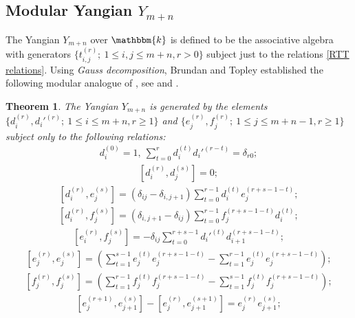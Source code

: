 \documentclass[12pt,reqno]{amsart}
\newcommand{\kk}{\mathbbm{k}}
\numberwithin{equation}{section}
\newtheorem{Theorem}{Theorem}[section]
\theoremstyle{Theorem}
\theoremstyle{remark}
\numberwithin{equation}{section}
\begin{document}
\subsection{Modular Yangian $Y_{m+n}$}
The Yangian $Y_{m+n}$ over $\kk$ is defined to be the associative algebra with generators $\{t_{i,j}^{(r)};~1\leq i,j\leq m+n, r>0\}$ subject just to the relations \eqref{RTT relations}.
Using {\em Gauss decomposition},
Brundan and Topley established the following modular analogue of \cite[Theorem 5.2]{BK05},
see \cite[Theorem 4.3]{BT18} and \cite[Theorem 3.8]{CH23}.
\begin{Theorem}\label{thm: Drinfled presentation ym+n}
The Yangian $Y_{m+n}$ is generated by the elements $\{d_i^{(r)},d_i'^{(r)};~1\leq i\leq m+n, r\geq 1\}$ and $\{e_j^{(r)},f_j^{(r)};~1\leq j\leq m+n-1, r\geq 1\}$ subject only to the following relations:
\begin{align}\label{di di' relation}
d_i^{(0)}=1,~\sum\limits_{t=0}^rd_i^{(t)}d_i'^{(r-t)}=\delta_{r0};
\end{align}
\begin{align}\label{di dj commu}
[d_i^{(r)},d_j^{(s)}]=0;
\end{align}
\begin{align}\label{Drinfeld generators relation 1}
[d_i^{(r)},e_j^{(s)}]=(\delta_{ij}-\delta_{i,j+1})\sum\limits_{t=0}^{r-1}d_i^{(t)}e_j^{(r+s-1-t)};
\end{align}
\begin{align}\label{Drinfeld generators relation 2}
[d_i^{(r)},f_j^{(s)}]=(\delta_{i,j+1}-\delta_{ij})\sum\limits_{t=0}^{r-1}f_j^{(r+s-1-t)}d_i^{(t)};
\end{align}
\begin{align}\label{Drinfeld generators relation 3}
[e_i^{(r)},f_j^{(s)}]=-\delta_{ij}\sum\limits_{t=0}^{r+s-1}d_i'^{(t)}d_{i+1}^{(r+s-1-t)};
\end{align}
\begin{align}\label{Drinfeld generators relation 4}
[e_j^{(r)},e_j^{(s)}]=(\sum\limits_{t=1}^{s-1}e_j^{(t)}e_j^{(r+s-1-t)}-\sum\limits_{t=1}^{r-1}e_j^{(t)}e_j^{(r+s-1-t)});
\end{align}
\begin{align}\label{Drinfeld generators relation 5}
[f_j^{(r)},f_j^{(s)}]=(\sum\limits_{t=1}^{r-1}f_j^{(t)}f_j^{(r+s-1-t)}-\sum\limits_{t=1}^{s-1}f_j^{(t)}f_j^{(r+s-1-t)});
\end{align}
\begin{align}\label{Drinfeld generators relation 6}
[e_j^{(r+1)},e_{j+1}^{(s)}]-[e_j^{(r)},e_{j+1}^{(s+1)}]=e_j^{(r)}e_{j+1}^{(s)};

\end{align}
\end{Theorem}
\end{document}
